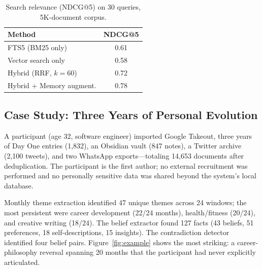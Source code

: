 \documentclass[conference]{IEEEtran}
\begin{document}
\begin{table}[t]
\caption{Search relevance (NDCG@5) on 30 queries, 5K-document corpus.}
\label{tab:search}
\footnotesize
\begin{tabular}{lc}
\toprule
\textbf{Method} & \textbf{NDCG@5} \\
\midrule
FTS5 (BM25 only)          & 0.61 \\
Vector search only         & 0.58 \\
Hybrid (RRF, $k{=}60$)    & 0.72 \\
Hybrid + Memory augment.   & 0.78 \\
\bottomrule
\end{tabular}
\end{table}

\subsection{Case Study: Three Years of Personal Evolution}

A participant (age 32, software engineer) imported Google Takeout, three years of Day One entries (1,832), an Obsidian vault (847 notes), a Twitter archive (2,100 tweets), and two WhatsApp exports---totaling 14,653 documents after deduplication. The participant is the first author; no external recruitment was performed and no personally sensitive data was shared beyond the system's local database.

Monthly theme extraction identified 47 unique themes across 24 windows; the most persistent were career development (22/24 months), health/fitness (20/24), and creative writing (18/24). The belief extractor found 127 facts (43 beliefs, 51 preferences, 18 self-descriptions, 15 insights). The contradiction detector identified four belief pairs. Figure~\ref{fig:example} shows the most striking: a career-philosophy reversal spanning 20 months that the participant had never explicitly articulated.
\end{document}
